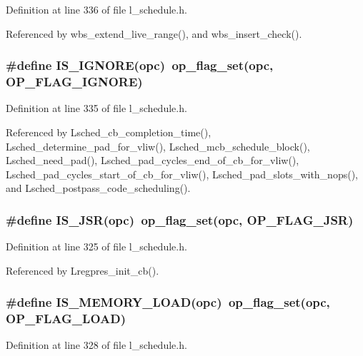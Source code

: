Definition at line 336 of file l\_\-schedule.h.

Referenced by wbs\_\-extend\_\-live\_\-range(), and wbs\_\-insert\_\-check().
\subsubsection{\setlength{\rightskip}{0pt plus 5cm}\#define IS\_\-IGNORE(opc)~op\_\-flag\_\-set(opc, OP\_\-FLAG\_\-IGNORE)}\label{l__schedule_8h_eed734fb96244d42b66fe9a63ca9184e}




Definition at line 335 of file l\_\-schedule.h.

Referenced by Lsched\_\-cb\_\-completion\_\-time(), Lsched\_\-determine\_\-pad\_\-for\_\-vliw(), Lsched\_\-mcb\_\-schedule\_\-block(), Lsched\_\-need\_\-pad(), Lsched\_\-pad\_\-cycles\_\-end\_\-of\_\-cb\_\-for\_\-vliw(), Lsched\_\-pad\_\-cycles\_\-start\_\-of\_\-cb\_\-for\_\-vliw(), Lsched\_\-pad\_\-slots\_\-with\_\-nops(), and Lsched\_\-postpass\_\-code\_\-scheduling().
\subsubsection{\setlength{\rightskip}{0pt plus 5cm}\#define IS\_\-JSR(opc)~op\_\-flag\_\-set(opc, OP\_\-FLAG\_\-JSR)}\label{l__schedule_8h_b1d78684bb00b444ceaf1953f3cfab34}




Definition at line 325 of file l\_\-schedule.h.

Referenced by Lregpres\_\-init\_\-cb().
\subsubsection{\setlength{\rightskip}{0pt plus 5cm}\#define IS\_\-MEMORY\_\-LOAD(opc)~op\_\-flag\_\-set(opc, OP\_\-FLAG\_\-LOAD)}\label{l__schedule_8h_b8a45273e2f062695778365babad6deb}




Definition at line 328 of file l\_\-schedule.h.
